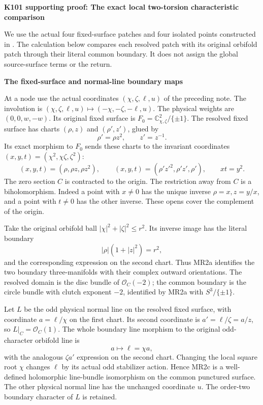 \par\bigskip\noindent\textbf{K101 supporting proof: The exact local two-torsion characteristic comparison}\par\nobreak
We use the actual four fixed-surface patches and four isolated points
constructed in . The
calculation below compares each resolved patch with its original
orbifold patch through their literal common boundary. It does not
assign the global source-surface terms or the return.

\par

\medskip\noindent\textbf{The fixed-surface and normal-line boundary maps}

\par\nobreak

At a node use the actual coordinates \((\chi,\zeta,\ell,u)\) of
the preceding note. The involution is
\((\chi,\zeta,\ell,u)\mapsto(-\chi,-\zeta,-\ell,u)\).
The physical weights are \((0,0,w,-w)\). Its original fixed
surface is \(F_0=\mathbb C^2_{\chi,\zeta}/\{\pm1\}\).
The resolved fixed surface has charts \((\rho,z)\) and
\((\rho',z')\), glued by
\[
 \rho'=\rho z^2,\qquad z'=z^{-1}.
\]
Its exact morphism to \(F_0\) sends these charts to the invariant
coordinates \((x,y,t)=(\chi^2,\chi\zeta,\zeta^2)\):
\[
 (x,y,t)=(\rho,\rho z,\rho z^2),\qquad
 (x,y,t)=(\rho' z'^2,\rho'z',\rho'),\qquad xt=y^2.
\tag{MR2a}
\]
The zero section \(C\) is contracted to the origin. The restriction
away from \(C\) is a biholomorphism. Indeed a point with \(x\ne0\)
has the unique inverse \(\rho=x,z=y/x\), and a point with \(t\ne0\)
has the other inverse. These opens cover the complement of the origin.

Take the original orbifold ball
\(|\chi|^2+|\zeta|^2\le r^2\). Its inverse image has the
literal boundary
\[
 |\rho|(1+|z|^2)=r^2,
\tag{MR2b}
\]
and the corresponding expression on the second chart. Thus MR2a
identifies the two boundary three-manifolds with their complex outward
orientations. The resolved domain is the disc bundle of
\(\mathcal O_C(-2)\); the common boundary is the circle bundle
with clutch exponent \(-2\), identified by MR2a with
\(S^3/\{\pm1\}\).

Let \(L\) be the odd physical normal line on the resolved fixed
surface, with coordinate \(a=\ell/\chi\) on the first chart.
Its second coordinate is \(a'=\ell/\zeta=a/z\), so
\(L|_C=\mathcal O_C(1)\). The whole boundary line morphism to
the original odd-character orbifold line is
\[
 a\longmapsto\ell=\chi a,
\tag{MR2c}
\]
with the analogous \(\zeta a'\) expression on the second chart.
Changing the local square root \(\chi\) changes \(\ell\) by
its actual odd stabilizer action. Hence MR2c is a well-defined
holomorphic line-bundle isomorphism on the common punctured surface.
The other physical normal line has the unchanged coordinate \(u\).
The order-two boundary character of \(L\) is retained.

